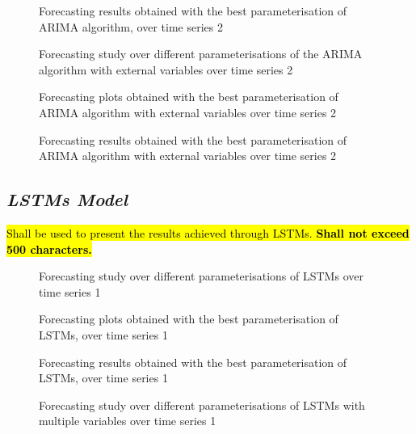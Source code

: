 \documentclass[10pt]{extarticle}
\newcommand{\ctext}[3][RGB]{%
  \begingroup
  \definecolor{hlcolor}{#1}{#2}\sethlcolor{hlcolor}%
  \hl{#3}%
  \endgroup
}
\begin{document}
\begin{figure}[H]
\caption{Forecasting results obtained with the best parameterisation of ARIMA algorithm, over time series 2}
\end{figure}

\begin{figure}[H]
\caption{Forecasting study over different parameterisations of the ARIMA algorithm with external variables over time series 2}
\end{figure}

\begin{figure}[H]
\caption{Forecasting plots obtained with the best parameterisation of ARIMA algorithm with external variables over time series 2}
\end{figure}

\begin{figure}[H]
\caption{Forecasting results obtained with the best parameterisation of ARIMA algorithm with external variables over time series 2}
\end{figure}

\subsection*{\textit{LSTMs Model}}
\ctext[RGB]{190,190,190}{Shall be used to present the results achieved through LSTMs.  \textbf{Shall not exceed 500 characters.}}

\begin{figure}[H]
\caption{Forecasting study over different parameterisations of LSTMs over time series 1}
\end{figure}

\begin{figure}[H]
\caption{Forecasting plots obtained with the best parameterisation of LSTMs, over time series 1}
\end{figure}

\begin{figure}[H]
\caption{Forecasting results obtained with the best parameterisation of LSTMs, over time series 1}
\end{figure}

\begin{figure}[H]
\caption{Forecasting study over different parameterisations of LSTMs with multiple variables over time series 1}
\end{figure}
\end{document}
